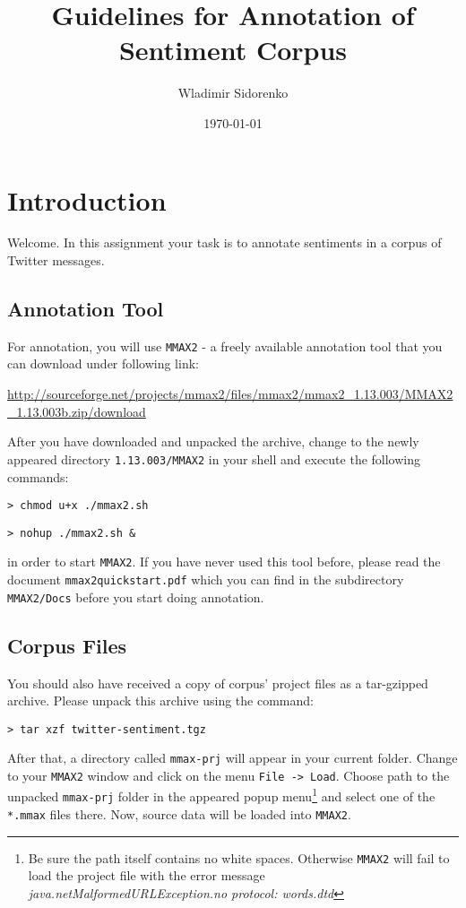 \documentclass[11pt,a4paper]{article}
\author{Wladimir Sidorenko}
\date{\today}
\title{Guidelines for Annotation of Sentiment Corpus}
\begin{document}
\maketitle{}
\section{Introduction}
Welcome. In this assignment your task is to annotate sentiments in a
corpus of Twitter messages.

\subsection{Annotation Tool}

For annotation, you will use \texttt{MMAX2} - a freely available
annotation tool that you can download under following link:

\url{http://sourceforge.net/projects/mmax2/files/mmax2/mmax2_1.13.003/MMAX2_1.13.003b.zip/download}

After you have downloaded and unpacked the archive, change to the
newly appeared directory \texttt{1.13.003/MMAX2} in your shell and
execute the following commands:

\texttt{> chmod u+x ./mmax2.sh}

\texttt{> nohup ./mmax2.sh \&}

{\setlength{\parindent}{0pt} in order to start \texttt{MMAX2}.  If you
  have never used this tool before, please read the document
  \texttt{mmax2quickstart.pdf} which you can find in the subdirectory
  \texttt{MMAX2/Docs} before you start doing annotation.}

\subsection{Corpus Files}

You should also have received a copy of corpus' project files as a
tar-gzipped archive.  Please unpack this archive using the
command:

\texttt{> tar xzf twitter-sentiment.tgz}

{\setlength{\parindent}{0pt} After that, a directory called
  \texttt{mmax-prj} will appear in your current folder.  Change to
  your \texttt{MMAX2} window and click on the menu \texttt{File ->
    Load}.  Choose path to the unpacked \texttt{mmax-prj} folder in
  the appeared popup menu\footnote{Be sure the path itself contains no
    white spaces. Otherwise \texttt{MMAX2} will fail to load the
    project file with the error message
    \emph{java.netMalformedURLException.no protocol: words.dtd}} and
  select one of the \texttt{*.mmax} files there. Now, source data will
  be loaded into \texttt{MMAX2}.}
\end{document}

